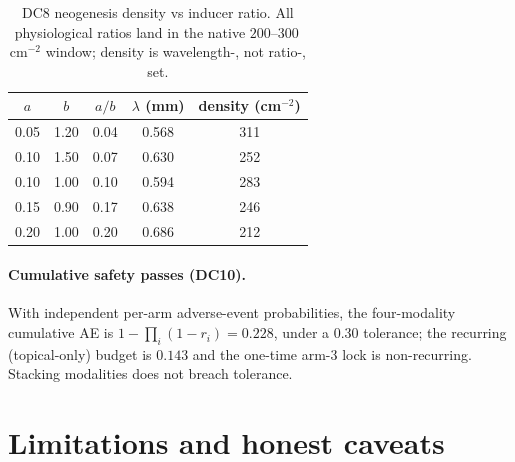 \documentclass[11pt,a4paper]{article}
\begin{document}
\begin{table}[h]
\centering\small
\begin{tabular}{ccccc}
\toprule
$a$ & $b$ & $a/b$ & $\lambda$ (mm) & density (cm$^{-2}$) \\
\midrule
0.05 & 1.20 & 0.04 & 0.568 & 311 \\
0.10 & 1.50 & 0.07 & 0.630 & 252 \\
0.10 & 1.00 & 0.10 & 0.594 & 283 \\
0.15 & 0.90 & 0.17 & 0.638 & 246 \\
0.20 & 1.00 & 0.20 & 0.686 & 212 \\
\bottomrule
\end{tabular}
\caption{DC8 neogenesis density vs inducer ratio. All physiological ratios land in
the native $200$--$300$\,cm$^{-2}$ window; density is wavelength-, not ratio-, set.}
\label{tab:results-na}
\end{table}

\paragraph{Cumulative safety passes (DC10).} With independent per-arm
adverse-event probabilities, the four-modality cumulative AE is
$1-\prod_i(1-r_i)=0.228$, under a $0.30$ tolerance; the recurring (topical-only)
budget is $0.143$ and the one-time arm-3 lock is non-recurring. Stacking modalities
does not breach tolerance.

\section{Limitations and honest caveats}
\label{sec:limits}
\end{document}
